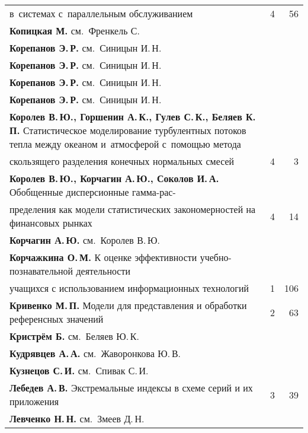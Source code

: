 {\begin{tabular}{p{388pt}rr}
\hspace*{21pt}в~сис\-те\-мах с~параллельным обслуживанием&4&56\\[-.75pt]
\textbf{Копицкая М.} см.\ Френкель С.&&\\[-.75pt]
\textbf{Корепанов Э.\,Р.} см.\ Синицын И.\,Н.&&\\[-.75pt]
\textbf{Корепанов Э.\,Р.} см.\ Синицын И.\,Н.&&\\[-.75pt]
\textbf{Корепанов Э.\,Р.} см.\ Синицын И.\,Н.&&\\[-.75pt]
\textbf{Корепанов Э.\,Р.} см.\ Синицын И.\,Н.&&\\[-.75pt]
\hangindent=21pt\noindent\textbf{Королев В.\,Ю., Горшенин А.\,К., Гулев С.\,К., Беляев К.\,П.}
Статистическое моделирование турбулентных потоков тепла между океаном
и~атмосферой с~помощью метода\linebreak
\\[-12.35pt]
\hspace*{21pt}скользящего разделения конечных
нормальных смесей&4&3\\[-.75pt]
\hangindent=21pt\noindent\textbf{Королев В.\,Ю., Корчагин А.\,Ю., Соколов И.\,А.} Обобщенные
дисперсионные гамма-рас-\linebreak
\\[-12.35pt]
\hspace*{21pt}пре\-де\-ле\-ния как модели статистических
закономерностей на финансовых рынках&4&14\\[-.75pt]
\textbf{Корчагин А.\,Ю.} см.\ Королев В.\,Ю.&&\\[-.75pt]
\textbf{Корчажкина О.\,М.} К оценке эффективности учебно-познавательной
деятельности\linebreak
\\[-12.35pt]
\hspace*{21pt}учащихся с использованием информационных
технологий&1&106\\[-.75pt]
\textbf{Кривенко М.\,П.} Модели для представления и обработки
референсных значений&2&63\\[-.75pt]
\textbf{Кристрём Б.} см.\ Беляев Ю.\,К.&&\\[-.75pt]
\textbf{Кудрявцев А.\,А.} см.\ Жаворонкова Ю.\,В.&&\\[-.75pt]
\textbf{Кузнецов С.\,И.} см.\ Спивак С.\,И.&&\\[-.75pt]
\textbf{Лебедев А.\,В.} Экстремальные индексы в схеме серий и их
приложения&3&39\\[-.75pt]
\textbf{Левченко Н.\,Н.} см.\ Змеев Д.\,Н.&&\\[-.75pt]

\end{tabular}}
